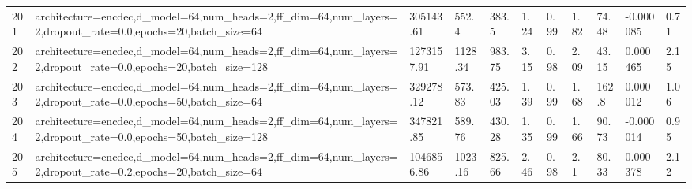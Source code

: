 \begin{longtable}{C{0.8cm} L{2cm} C{1.15cm} C{1.15cm} C{1.15cm} C{1.15cm} C{0.85cm} C{1.25cm} C{1.2cm} C{1.5cm} C{1.0cm}}
201 & architecture=encdec,\newline d\_model=64,\newline num\_heads=2,\newline ff\_dim=64,\newline num\_layers=2,\newline dropout\_rate=0.0,\newline epochs=20,\newline batch\_size=64 & 305143.61 & 552.4 & 383.5 & 1.24 & 0.99 & 1.82 & 74.48 & -0.000085 & 0.71 \\
202 & architecture=encdec,\newline d\_model=64,\newline num\_heads=2,\newline ff\_dim=64,\newline num\_layers=2,\newline dropout\_rate=0.0,\newline epochs=20,\newline batch\_size=128 & 1273157.91 & 1128.34 & 983.75 & 3.15 & 0.98 & 2.09 & 43.15 & 0.000465 & 2.15 \\
203 & architecture=encdec,\newline d\_model=64,\newline num\_heads=2,\newline ff\_dim=64,\newline num\_layers=2,\newline dropout\_rate=0.0,\newline epochs=50,\newline batch\_size=64 & 329278.12 & 573.83 & 425.03 & 1.39 & 0.99 & 1.68 & 162.8 & 0.000012 & 1.06 \\
204 & architecture=encdec,\newline d\_model=64,\newline num\_heads=2,\newline ff\_dim=64,\newline num\_layers=2,\newline dropout\_rate=0.0,\newline epochs=50,\newline batch\_size=128 & 347821.85 & 589.76 & 430.28 & 1.35 & 0.99 & 1.66 & 90.73 & -0.000014 & 0.95 \\
205 & architecture=encdec,\newline d\_model=64,\newline num\_heads=2,\newline ff\_dim=64,\newline num\_layers=2,\newline dropout\_rate=0.2,\newline epochs=20,\newline batch\_size=64 & 1046856.86 & 1023.16 & 825.66 & 2.46 & 0.98 & 2.1 & 80.33 & 0.000378 & 2.12 \\

\end{longtable}
